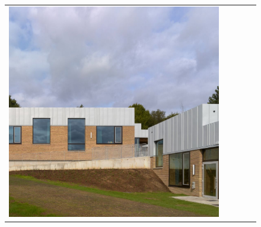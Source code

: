 \begin{figure}[H]
{\begin{tabular}{@{}ccccc@{}}
      \includegraphics[width=\linewidth]{Images/LoRAs/Plintwerking/Training_images/5.jpg} \\[2pt]


\end{tabular}}
\end{figure}
